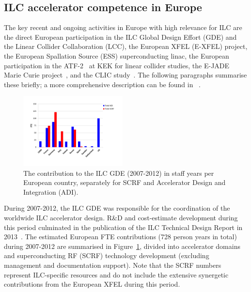 \documentclass[%
 reprint,
 floatfix,
 amsmath,amssymb,
 aps,
]{revtex4-1}
\begin{document}
\subsection{ILC accelerator competence in Europe~\label{sec:acc:competence}}

The key recent and ongoing activities in Europe with high relevance for ILC are the direct European participation in the ILC Global Design Effort (GDE) and the Linear Collider Collaboration (LCC),
the European XFEL (E-XFEL) project, the European Spallation Source (ESS) superconducting linac, the European 
participation in the ATF-2~\cite{Grishanov:2006kx} at KEK for linear collider studies, the E-JADE Marie 
Curie project~\cite{ejade}, and the CLIC study~\cite{Aicheler:2012bya,Linssen:2012hp}. The following paragraphs 
summarise these briefly; a more comprehensive description can be found in ~\cite{ejade-report}. 

\begin{figure}[htbp]
\includegraphics[width=0.4825\textwidth]{figures/EU-GDE-FTE-columns-per-country.pdf}
\caption{\label{fig:PrePrep:ilcgde4} The contribution to the ILC GDE (2007-2012) in staff years per European country, separately for SCRF and Accelerator Design and Integration (ADI).}
\end{figure}

During 2007-2012, the ILC GDE was responsible for the coordination of the worldwide ILC accelerator design. 
R\&D and cost-estimate development during this period culminated in the publication of the ILC Technical Design Report in 2013~\cite{Behnke:2013xla}. 
The estimated European FTE contributions (728 person years in total) during 2007-2012 are summarised in Figure~\ref{fig:PrePrep:ilcgde4}, 
divided into accelerator domains and superconducting RF (SCRF) technology development (excluding management and documentation support). 
Note that the SCRF numbers represent ILC-specific resources and do not include the extensive synergetic contributions from the European XFEL during this period.
\end{document}
